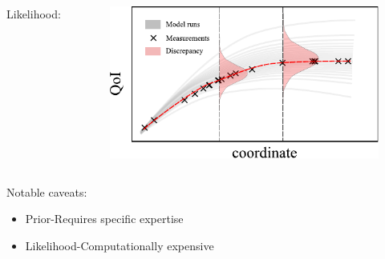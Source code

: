 \begin{frame}
{\begin{columns}
    Likelihood:
    \begin{figure}[!ht]       
    \includegraphics[scale=0.6]{figures/figure-likelihood.pdf}
    \end{figure} 
\end{columns}
\begin{alertblock}{Notable caveats:}
\begin{itemize}
    \item Prior-Requires specific expertise
    \item Likelihood-Computationally expensive 
\end{itemize}  
\end{alertblock}
}



 \end{frame}

